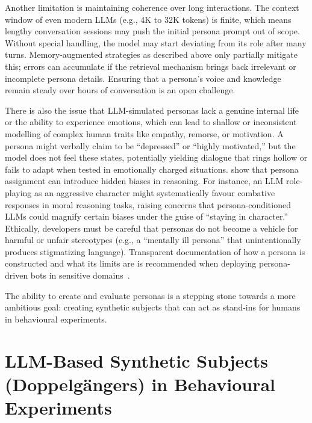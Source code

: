 Another limitation is maintaining coherence over long interactions. The context window of even modern LLMs (e.g., 4K to 32K tokens) is finite, which means lengthy conversation sessions may push the initial persona prompt out of scope. Without special handling, the model may start deviating from its role after many turns. Memory-augmented strategies as described above only partially mitigate this; errors can accumulate if the retrieval mechanism brings back irrelevant or incomplete persona details. Ensuring that a persona's voice and knowledge remain steady over hours of conversation is an open challenge.

There is also the issue that LLM-simulated personas lack a genuine internal life or the ability to experience emotions, which can lead to shallow or inconsistent modelling of complex human traits like empathy, remorse, or motivation. A persona might verbally claim to be ``depressed'' or ``highly motivated,'' but the model does not feel these states, potentially yielding dialogue that rings hollow or fails to adapt when tested in emotionally charged situations. \citet{gupta-etal-2024-sociodemographic} show that persona assignment can introduce hidden biases in reasoning. For instance, an LLM role-playing as an aggressive character might systematically favour combative responses in moral reasoning tasks, raising concerns that persona-conditioned LLMs could magnify certain biases under the guise of ``staying in character.'' Ethically, developers must be careful that personas do not become a vehicle for harmful or unfair stereotypes (e.g., a ``mentally ill persona” that unintentionally produces stigmatizing language). Transparent documentation of how a persona is constructed and what its limits are is recommended when deploying persona-driven bots in sensitive domains~\cite{wu2025personastalksrevisitingimpact}.

The ability to create and evaluate personas is a stepping stone towards a more ambitious goal: creating synthetic subjects that can act as stand-ins for humans in behavioural experiments.




\section{LLM-Based Synthetic Subjects (Doppelgängers) in Behavioural Experiments}
\label{sec:background_synthetic_validation}

